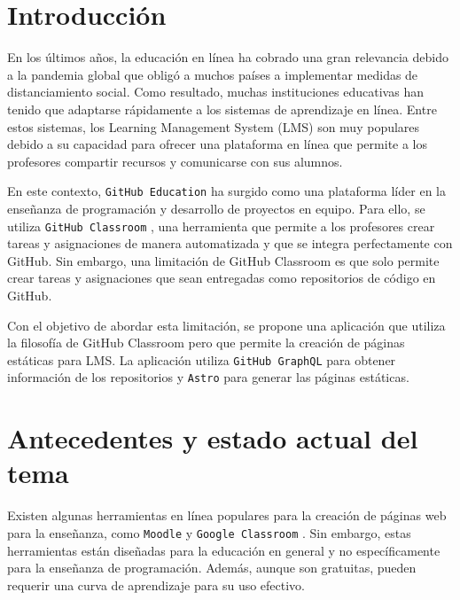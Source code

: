 \section{Introducción}

En los últimos años, la educación en línea ha cobrado una gran relevancia debido a la pandemia global que obligó a muchos países a implementar medidas de distanciamiento social. Como resultado, muchas instituciones educativas han tenido que adaptarse rápidamente a los sistemas de aprendizaje en línea. Entre estos sistemas, los Learning Management System (LMS) son muy populares debido a su capacidad para ofrecer una plataforma en línea que permite a los profesores compartir recursos y comunicarse con sus alumnos.

En este contexto, \verb|GitHub Education| \cite{github-education} ha surgido como una plataforma líder en la enseñanza de programación y desarrollo de proyectos en equipo. Para ello, se utiliza \verb|GitHub Classroom| \cite{github-classroom}, una herramienta que permite a los profesores crear tareas y asignaciones de manera automatizada y que se integra perfectamente con GitHub. Sin embargo, una limitación de GitHub Classroom es que solo permite crear tareas y asignaciones que sean entregadas como repositorios de código en GitHub.

Con el objetivo de abordar esta limitación, se propone una aplicación que utiliza la filosofía de GitHub Classroom pero que permite la creación de páginas estáticas para LMS. La aplicación utiliza \verb|GitHub GraphQL| \cite{github-graphql} para obtener información de los repositorios y \verb|Astro| \cite{astro} para generar las páginas estáticas.

\section{Antecedentes y estado actual del tema}

Existen algunas herramientas en línea populares para la creación de páginas web para la enseñanza, como \verb|Moodle| \cite{moodle} y \verb|Google Classroom| \cite{google-classroom}. Sin embargo, estas herramientas están diseñadas para la educación en general y no específicamente para la enseñanza de programación. Además, aunque son gratuitas, pueden requerir una curva de aprendizaje para su uso efectivo.

